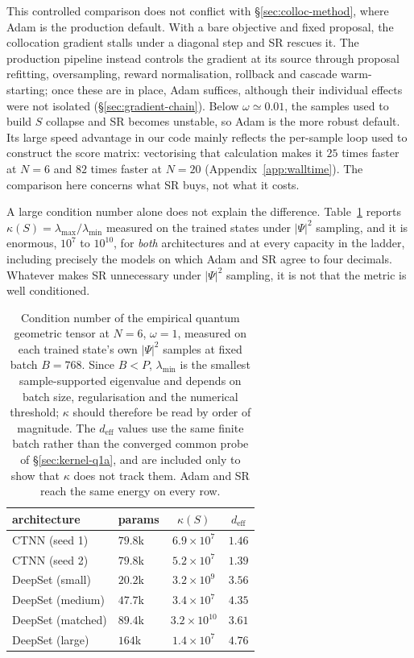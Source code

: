 This controlled comparison does not conflict with \S\ref{sec:colloc-method}, where Adam is
the production default. With a bare objective and fixed proposal, the collocation gradient
stalls under a diagonal step and SR rescues it. The production pipeline instead controls the
gradient at its source through proposal refitting, oversampling, reward normalisation,
rollback and cascade warm-starting; once these are in place, Adam suffices, although their
individual effects were not isolated (\S\ref{sec:gradient-chain}). Below
$\omega\simeq0.01$, the samples used to build $S$ collapse and SR becomes unstable, so Adam
is the more robust default. Its large speed advantage in our code mainly reflects the
per-sample loop used to construct the score matrix: vectorising that calculation makes it
$25$ times faster at $N=6$ and $82$ times faster at $N=20$
(Appendix~\ref{app:walltime}). The comparison here concerns what SR buys, not what it costs.

A large condition number alone does not explain the difference. Table~\ref{tab:kappa}
reports
$\kappa(S)=\lambda_{\max}/\lambda_{\min}$ measured on the trained states under $|\Psi|^2$
sampling, and it is enormous, $10^{7}$ to $10^{10}$, for \emph{both} architectures and at
every capacity in the ladder, including precisely the models on which Adam and SR agree to
four decimals. Whatever makes SR unnecessary under $|\Psi|^2$ sampling, it is not that the
metric is well conditioned.

\begin{table}[htbp]\centering
\caption[Condition number of the empirical geometric tensor]{Condition number of the
empirical quantum geometric tensor at $N{=}6$, $\omega=1$, measured on each trained state's
own $|\Psi|^2$ samples at fixed batch $B=768$. Since $B<P$, $\lambda_{\min}$ is the smallest
sample-supported eigenvalue and depends on batch size, regularisation and the numerical
threshold; $\kappa$ should therefore be read by order of magnitude. The
$d_{\mathrm{eff}}$ values use the same finite batch rather than the converged common probe of
\S\ref{sec:kernel-q1a}, and are included only to show that $\kappa$ does not track them. Adam
and SR reach the same energy on every row.}
\label{tab:kappa}
\begin{tabular}{llcc}
\hline
architecture & params & $\kappa(S)$ & $d_{\mathrm{eff}}$ \\
\hline
CTNN (seed 1)      & $79.8$k & $6.9\times10^{7}$  & $1.46$ \\
CTNN (seed 2)      & $79.8$k & $5.2\times10^{7}$  & $1.39$ \\
DeepSet (small)    & $20.2$k & $3.2\times10^{9}$  & $3.56$ \\
DeepSet (medium)   & $47.7$k & $3.4\times10^{7}$  & $4.35$ \\
DeepSet (matched)  & $89.4$k & $3.2\times10^{10}$ & $3.61$ \\
DeepSet (large)    & $164$k  & $1.4\times10^{7}$  & $4.76$ \\
\hline
\end{tabular}
\end{table}

